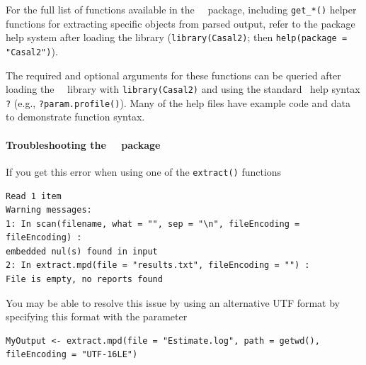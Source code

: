 For the full list of functions available in the \CNAME\ \R\ package, including \texttt{get\_*()} helper functions for extracting specific objects from parsed output, refer to the package help system after loading the library (\texttt{library(Casal2)}; then \texttt{help(package = "Casal2")}).

The required and optional arguments for these functions can be queried after loading the \CNAME\ \R\ library with \texttt{library(Casal2)} and using the standard \R\ help syntax \texttt{?} (e.g., \texttt{?param.profile()}). Many of the help files have example code and data to demonstrate function syntax.

\paragraph*{Troubleshooting the \cname\ \R\ package}

If you get this error when using one of the \texttt{extract()} functions

\begin{lstlisting}
Read 1 item
Warning messages:
1: In scan(filename, what = "", sep = "\n", fileEncoding = fileEncoding) :
embedded nul(s) found in input
2: In extract.mpd(file = "results.txt", fileEncoding = "") :
File is empty, no reports found
\end{lstlisting}

You may be able to resolve this issue by using an alternative UTF format by specifying this format with the  parameter

\begin{lstlisting}
MyOutput <- extract.mpd(file = "Estimate.log", path = getwd(), fileEncoding = "UTF-16LE")
\end{lstlisting}
